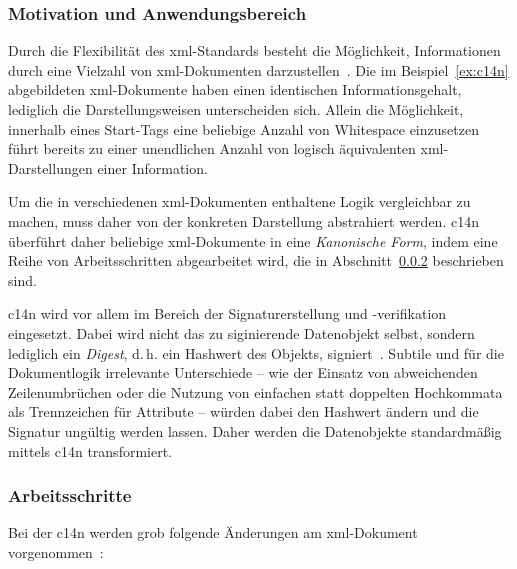 \subsubsection{Motivation und Anwendungsbereich}
\label{sec:c14nscope}

Durch die Flexibilität des \acrshort{xml}-Standards besteht die Möglichkeit, Informationen durch eine Vielzahl von \acrshort{xml}-Dokumenten darzustellen~\cite{siddiqui2002c14n}. Die im Beispiel~\ref{ex:c14n} abgebildeten \acrshort{xml}-Dokumente haben einen identischen Informationsgehalt, lediglich die Darstellungsweisen unterscheiden sich. Allein die Möglichkeit, innerhalb eines Start-Tags eine beliebige Anzahl von Whitespace einzusetzen~\cite[Produktionsregeln 3 und 40]{xml} führt bereits zu einer unendlichen Anzahl von logisch äquivalenten \acrshort{xml}-Darstellungen einer Information.

Um die in verschiedenen \acrshort{xml}-Dokumenten enthaltene Logik vergleichbar zu machen, muss daher von der konkreten Darstellung abstrahiert werden. \acrlong{c14n} überführt daher beliebige \acrshort{xml}-Dokumente in eine \emph{Kanonische Form}, indem eine Reihe von Arbeitsschritten abgearbeitet wird, die in Abschnitt~\ref{sec:c14nsteps} beschrieben sind.

\acrlong{c14n} wird vor allem im Bereich der Signaturerstellung und -verifikation eingesetzt. Dabei wird nicht das zu siginierende Datenobjekt selbst, sondern lediglich ein \emph{Digest}, d.\,h. ein Hashwert des Objekts, signiert~\cite[Abschnitt 2.0]{xmlsig}. Subtile und für die Dokumentlogik irrelevante Unterschiede -- wie der Einsatz von abweichenden Zeilenumbrüchen oder die Nutzung von einfachen statt doppelten Hochkommata als Trennzeichen für Attribute -- würden dabei den Hashwert ändern und die Signatur ungültig werden lassen. Daher werden die Datenobjekte standardmäßig mittels \acrlong{c14n} transformiert.~\cite[Abschnitt 4.3.3.2]{xmlsig}

\subsubsection{Arbeitsschritte}
\label{sec:c14nsteps}

Bei der \acrlong{c14n} werden grob folgende Änderungen am
\acrshort{xml}-Dokument vorgenommen~\cite[Abschnitt 1.1]{c14n}:

